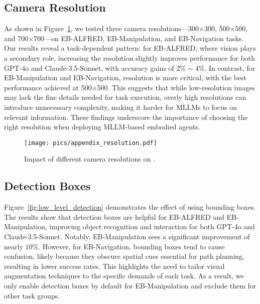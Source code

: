 \subsection{Camera Resolution} \label{ap:camera_resolution}

As shown in Figure~\ref{fig:appendix_resolution}, we tested three camera resolutions—300×300, 500×500, and 700×700—on EB-ALFRED, EB-Manipulation, and EB-Navigation tasks. Our results reveal a task-dependent pattern: for EB-ALFRED, where vision plays a secondary role, increasing the resolution slightly improves performance for both GPT-4o and Claude-3.5-Sonnet, with accuracy gains of $2\% \sim 4\%$. In contrast, for EB-Manipulation and EB-Navigation, resolution is more critical, with the best performance achieved at 500×500. This suggests that while low-resolution images may lack the fine details needed for task execution, overly high resolutions can introduce unnecessary complexity, making it harder for MLLMs to focus on relevant information. These findings underscore the importance of choosing the right resolution when deploying MLLM-based embodied agents.


\begin{figure}[h!]
\begin{center}
\texttt{[image: pics/appendix\_resolution.pdf]}
\end{center}
\vspace{-1em}
\caption{Impact of different camera resolutions on \name.}
\label{fig:appendix_resolution}
\end{figure}

\subsection{Detection Boxes}

Figure~\ref{fig:low_level_detection} demonstrates the effect of using bounding boxes. The results show that detection boxes are helpful for EB-ALFRED and EB-Manipulation, improving object recognition and interaction for both GPT-4o and Claude-3.5-Sonnet. Notably, EB-Manipulation sees a significant improvement of nearly $10\%$. However, for EB-Navigation, bounding boxes tend to cause confusion, likely because they obscure spatial cues essential for path planning, resulting in lower success rates. This highlights the need to tailor visual augmentation techniques to the specific demands of each task. As a result, we only enable detection boxes by default for EB-Manipulation and exclude them for other task groups.

